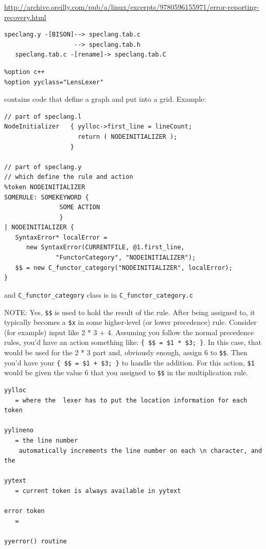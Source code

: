 \url{http://archive.oreilly.com/pub/a/linux/excerpts/9780596155971/error-reporting-recovery.html}
\begin{verbatim}
speclang.y -[BISON]--> speclang.tab.c
                   --> speclang.tab.h 
   speclang.tab.c -[rename]-> speclang.tab.C

\end{verbatim}
\begin{verbatim}
%option c++                                                                                                   
%option yyclass="LensLexer"      
\end{verbatim}
contains code that define a graph and put into
a grid.
% 
Example:
\begin{verbatim}
// part of speclang.l
NodeInitializer   { yylloc->first_line = lineCount;
                    return ( NODEINITIALIZER );
                  }
                  
// part of speclang.y
// which define the rule and action
%token NODEINITIALIZER
SOMERULE: SOMEKEYWORD {
               SOME ACTION
               }
| NODEINITIALIZER {
   SyntaxError* localError = 
      new SyntaxError(CURRENTFILE, @1.first_line, 
		      "FunctorCategory", "NODEINITIALIZER");
   $$ = new C_functor_category("NODEINITIALIZER", localError);
}
\end{verbatim}
and \verb!C_functor_category! class is in \verb!C_functor_category.c!

\begin{mdframed}

NOTE: Yes, \verb!$$! is used to hold the result of the rule. After being
assigned to, it typically becomes a \verb!$x! in some higher-level (or lower
precedence) rule. Consider (for example) input like 2 * 3 + 4. Assuming you
follow the normal precedence rules, you'd have an action something like:
\verb!{ $$ = $1 * $3; }!. In this case, that would be used for the 2 * 3 part
and, obviously enough, assign 6 to \verb!$$!. Then you'd have your 
\verb!{ $$ = $1 + $3; }! to handle the addition. For this action, \verb!$1!
would be given the value 6 that you assigned to \verb!$$! in the multiplication rule.

\begin{verbatim}
yylloc 
   = where the  lexer has to put the location information for each token
   
yylineno 
   = the line number
    automatically increments the line number on each \n character, and the

yytext
   = current token is always available in yytext 
   
error token 
   = 
      
yyerror() routine
\end{verbatim}

\end{mdframed}




